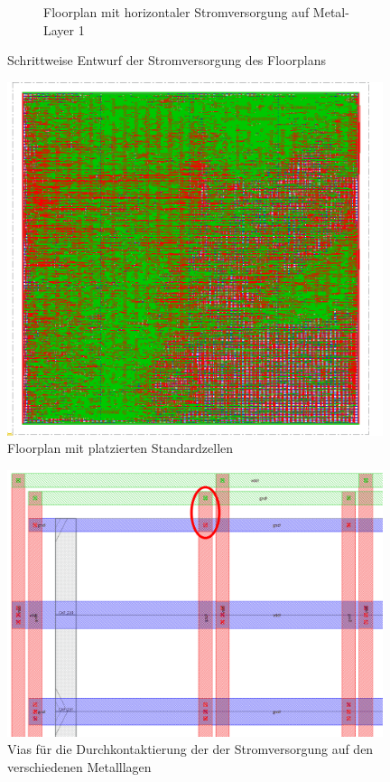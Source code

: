 \begin{figure}
\begin{subfigure}[b]{0.475\textwidth}
            \caption{{\small Floorplan mit horizontaler Stromversorgung auf Metal-Layer 1}}    
            \label{pic:floorplan4}
        \end{subfigure}
        \caption{Schrittweise Entwurf der Stromversorgung des Floorplans} 
        \label{fig:floorplanSpannungsversorgung}
    \end{figure}

    \begin{figure}[ht!]
     \centering
     \includegraphics[width=0.98\textwidth]{img/DFT_FLOORPLAN/CROPPED_IMG/FP_5.png}
     \caption{Floorplan mit platzierten Standardzellen}
     \label{pic:floorplan1Standardzellen}
    \end{figure}

    
    \begin{figure}[ht!]
     \centering
     \includegraphics[width=0.98\textwidth]{img/DFT_FLOORPLAN/CROPPED_IMG/Vias.png}
     \caption{Vias für die Durchkontaktierung der der Stromversorgung auf den verschiedenen Metalllagen}
     \label{pic:floorplanVias}
    \end{figure}
 
